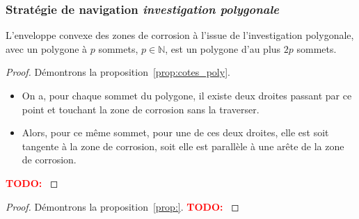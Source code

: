 \documentclass[francais,RandD]{rapportPFE}
\newcommand{\TODO}[1]{\textcolor{red}{\textbf{TODO: #1}}}
\begin{document}
			\subsubsection*{Stratégie de navigation \textit{investigation polygonale}}
				\begin{Proposition}
					L'enveloppe convexe des zones de corrosion à l'issue de l'investigation polygonale, avec un polygone à $p$ sommets, $p \in \mathbb{N}$, est un polygone d'au plus $2p$ sommets.
					\label{prop:cotes_poly}
				\end{Proposition}
				\begin{proof}
					Démontrons la proposition~\ref{prop:cotes_poly}.
					\begin{itemize}
						\item On a, pour chaque sommet du polygone, il existe deux droites passant par ce point et touchant la zone de corrosion sans la traverser.
						\item Alors, pour ce même sommet, pour une de ces deux droites, elle est soit tangente à la zone de corrosion, soit elle est parallèle à une arête de la zone de corrosion.
					\end{itemize}
					\TODO{}
				\end{proof}

				\begin{Proposition}
					\label{prop:}
				\end{Proposition}
				\begin{proof}
					Démontrons la proposition~\ref{prop:}.
					\TODO{}
				\end{proof}
\end{document}
